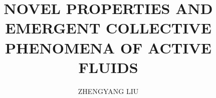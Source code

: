 

\phd %

%
\title{\bf NOVEL PROPERTIES AND EMERGENT COLLECTIVE PHENOMENA OF ACTIVE FLUIDS}
\author{ZHENGYANG LIU}


\abstract{}

\copyrightpage       %

\acknowledgements{}
\dedication{}


\beforepreface

\figurespage

\afterpreface
